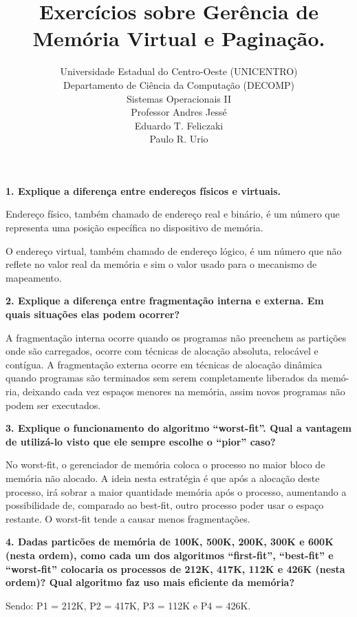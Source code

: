 \documentclass[12pt,a4paper]{article}
\title{Exercícios sobre Gerência de Memória Virtual e Paginação.}
\author{Universidade Estadual do Centro-Oeste (UNICENTRO)\\
        Departamento de Ciência da Computação (DECOMP)\\
        Sistemas Operacionais II \\
        Professor Andres Jessé \\
        Eduardo T. Feliczaki \\
	Paulo R. Urio }
\newcommand{\pergunta}[1]{\noindent \textbf{#1}}
\begin{document}
\maketitle

\pergunta{1. Explique a diferença entre endereços físicos e virtuais.}

Endereço físico, também chamado de endereço real e binário, é um número
que representa uma posição específica no dispositivo de memória.

O endereço virtual, também chamado de endereço lógico,  é um número que 
não reflete no valor real da memória e sim o valor usado para o mecanismo 
de mapeamento.

\pergunta {2. Explique a diferença entre fragmentação interna e externa. Em 
quais situações elas podem ocorrer?}

A fragmentação interna ocorre quando os programas não preenchem as partições 
onde são carregados, ocorre com técnicas de alocação absoluta, relocável
e contígua. A fragmentação externa ocorre em técnicas de alocação dinâmica
quando programas são terminados sem serem completamente liberados da memó-
ria, deixando cada vez espaços menores na memória, assim novos programas não
podem ser executados.

\pergunta{3. Explique o funcionamento do algoritmo ``worst-fit''. Qual a 
vantagem de utilizá-lo visto que ele sempre escolhe o ``pior'' caso?}

No worst-fit, o gerenciador de memória coloca o processo no maior
bloco de memória não alocado. A ideia nesta estratégia é que após a alocação
deste processo, irá sobrar a maior quantidade memória após o processo, 
aumentando a possibilidade de, comparado ao best-fit, outro processo poder 
usar o espaço restante.  O worst-fit tende a causar menos fragmentações.

\pergunta{4. Dadas particões de memória de 100K, 500K, 200K, 300K e 600K (nesta 
ordem), como cada um dos algoritmos ``first-fit'', ``best-fit'' e ``worst-fit''
colocaria os processos de 212K, 417K, 112K e 426K (nesta ordem)? Qual algoritmo 
faz uso mais eficiente da memória?}

Sendo: P1 = 212K, P2 = 417K, P3 = 112K e P4 = 426K.
\end{document}
